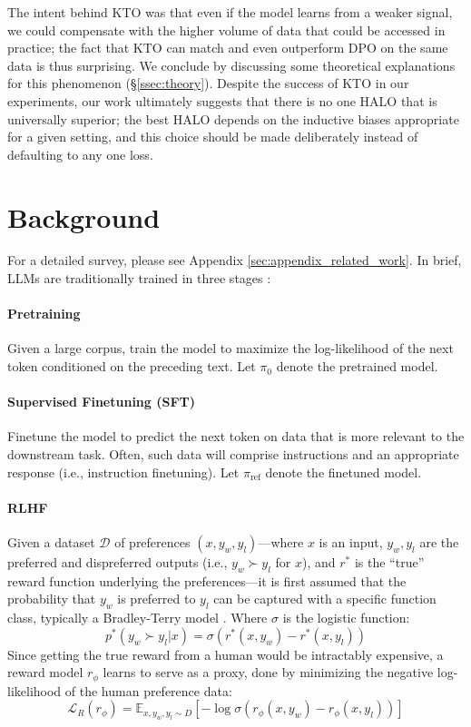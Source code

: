The intent behind KTO was that even if the model learns from a weaker signal, we could compensate with the higher volume of data that could be accessed in practice; the fact that KTO can match and even outperform DPO on the same data is thus surprising.
We conclude by discussing some theoretical explanations for this phenomenon (\S\ref{ssec:theory}).
Despite the success of KTO in our experiments, our work ultimately suggests that there is no one HALO that is universally superior; the best HALO depends on the inductive biases appropriate for a given setting, and this choice should be made deliberately instead of defaulting to any one loss.

\section{Background}
\label{sec:background}
For a detailed survey, please see Appendix \ref{sec:appendix_related_work}.
In brief, LLMs are traditionally trained in three stages \citep{ouyang2022training}:

\paragraph{Pretraining} Given a large corpus, train the model to maximize the log-likelihood of the next token conditioned on the preceding text.
Let $\pi_0$ denote the pretrained model.

\paragraph{Supervised Finetuning (SFT)} Finetune the model to predict the next token on data that is more relevant to the downstream task.
Often, such data will comprise instructions and an appropriate response (i.e., instruction finetuning).
Let $\pi_\text{ref}$ denote the finetuned model.

\paragraph{RLHF} Given a dataset $\mathcal{D}$ of preferences $(x, y_w, y_l)$---where $x$ is an input, $y_w, y_l$ are the preferred and dispreferred outputs (i.e., $y_w \succ y_l$ for $x$), and $r^*$ is the “true” reward function underlying the preferences---it is first assumed that the probability that $y_w$ is preferred to $y_l$ can be captured with a specific function class, typically a Bradley-Terry model \citep{bradley1952rank}. Where $\sigma$ is the logistic function:
\begin{equation}
p^*(y_w \succ y_l|x) = \sigma(r^*(x,y_w) - r^*(x,y_l))
\label{eq:bradley}
\end{equation}
Since getting the true reward from a human would be intractably expensive, a reward model $r_\phi$ learns to serve as a proxy, done by minimizing the negative log-likelihood of the human preference data:
$$\mathcal{L}_R(r_\phi) = \mathbb{E}_{x,y_w,y_l \sim D}[- \log \sigma(r_\phi(x, y_w) - r_\phi(x, y_l))]$$

